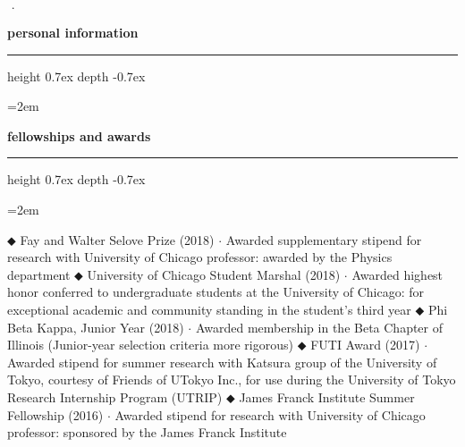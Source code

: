\documentclass[12pt]{scrartcl}
\newcommand{\Description}[1]{\hangindent=2em\hangafter=0\noindent\raggedright\footnotesize{#1}\par\normalsize\vspace{0.5em}} %
\def\vhrulefill{\leavevmode\leaders\hrule height 0.7ex depth \dimexpr0.4pt-0.7ex\hfill\kern0pt}
\begin{document}
\begin{cv}{ $\,\cdot\,$ \virgo}
\begin{minipage}[t]{.35\textwidth}

\noindent\textbf{personal information} \hspace{1ex} \vhrulefill \vspace{0.5em}  %

\hangindent=2em

\vspace{0.5em}

\end{minipage}

\vspace{0.5em}



\noindent\textbf{fellowships and awards} \hspace{1ex} \vhrulefill \vspace{0.5em}

\noindent\Description{\textcolor{nasaBlue}{$\mdblkdiamond$} {Fay and Walter Selove Prize} (2018)  $\cdot$ {Awarded supplementary stipend for research with University of Chicago professor: awarded by the Physics department}\newline
\textcolor{nasaBlue}{$\mdblkdiamond$} {University of Chicago Student Marshal} (2018)  $\cdot$ {Awarded highest honor conferred to undergraduate students at the University of Chicago: for exceptional academic and community standing in the student's third year}\newline
\textcolor{nasaBlue}{$\mdblkdiamond$} {Phi Beta Kappa, Junior Year} (2018)  $\cdot$ {Awarded membership in the Beta Chapter of Illinois (Junior-year selection criteria more rigorous)}\newline
\textcolor{nasaBlue}{$\mdblkdiamond$} {FUTI Award} (2017)  $\cdot$ {Awarded stipend for summer research with Katsura group of the University of Tokyo, courtesy of Friends of UTokyo Inc., for use during the University of Tokyo Research Internship Program (UTRIP)}\newline
\textcolor{nasaBlue}{$\mdblkdiamond$} {James Franck Institute Summer Fellowship} (2016)  $\cdot$ {Awarded stipend for research with University of Chicago professor: sponsored by the James Franck Institute}%
}


\end{cv}
\end{document}
